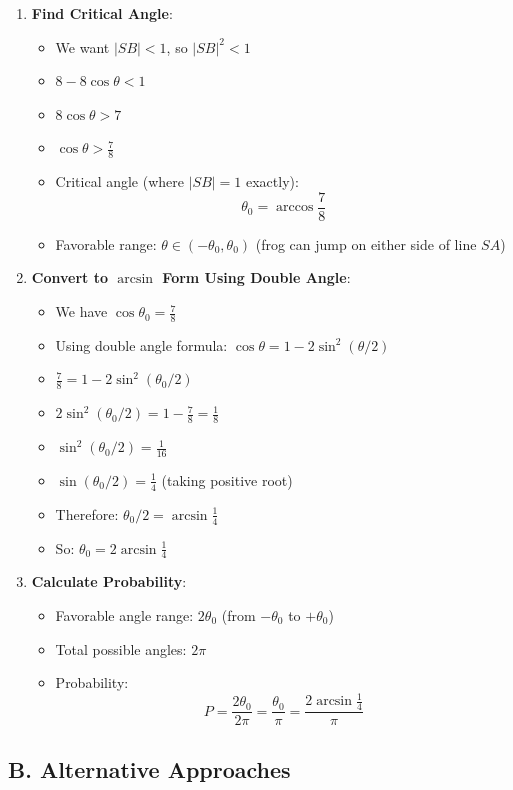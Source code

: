 \documentclass[12pt]{article}
\begin{document}
\begin{solutionbox}
\begin{enumerate}[leftmargin=*]
    \item \textbf{Find Critical Angle}: 
    \begin{itemize}
        \item We want $|SB| < 1$, so $|SB|^2 < 1$
        \item $8 - 8\cos\theta < 1$
        \item $8\cos\theta > 7$
        \item $\cos\theta > \frac{7}{8}$
        \item Critical angle (where $|SB| = 1$ exactly):
        \[\theta_0 = \arccos\frac{7}{8}\]
        \item Favorable range: $\theta \in (-\theta_0, \theta_0)$ (frog can jump on either side of line $SA$)
    \end{itemize}
    
    \item \textbf{Convert to $\arcsin$ Form Using Double Angle}: 
    \begin{itemize}
        \item We have $\cos\theta_0 = \frac{7}{8}$
        \item Using double angle formula: $\cos\theta = 1 - 2\sin^2(\theta/2)$
        \item $\frac{7}{8} = 1 - 2\sin^2(\theta_0/2)$
        \item $2\sin^2(\theta_0/2) = 1 - \frac{7}{8} = \frac{1}{8}$
        \item $\sin^2(\theta_0/2) = \frac{1}{16}$
        \item $\sin(\theta_0/2) = \frac{1}{4}$ (taking positive root)
        \item Therefore: $\theta_0/2 = \arcsin\frac{1}{4}$
        \item So: $\theta_0 = 2\arcsin\frac{1}{4}$
    \end{itemize}
    
    \item \textbf{Calculate Probability}: 
    \begin{itemize}
        \item Favorable angle range: $2\theta_0$ (from $-\theta_0$ to $+\theta_0$)
        \item Total possible angles: $2\pi$
        \item Probability:
        \[P = \frac{2\theta_0}{2\pi} = \frac{\theta_0}{\pi} = \frac{2\arcsin\frac{1}{4}}{\pi}\]
    \end{itemize}
\end{enumerate}

\subsection*{B. Alternative Approaches}


\end{solutionbox}
\end{document}
